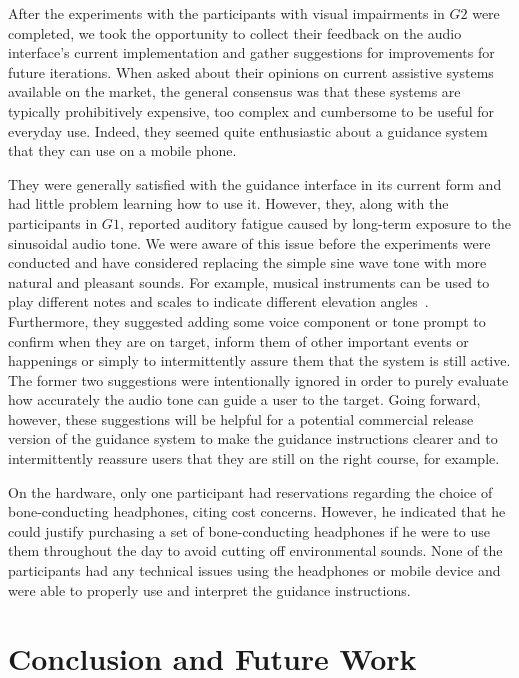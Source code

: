\documentclass{llncs}
\begin{document}
After the experiments with the participants with visual impairments in $G2$ were completed, we took the opportunity to collect their feedback on the audio interface's current implementation and gather suggestions for improvements for future iterations.
When asked about their opinions on current assistive systems available on the market, the general consensus was that these systems are typically prohibitively expensive, too complex and cumbersome to be useful for everyday use.
Indeed, they seemed quite enthusiastic about a guidance system that they can use on a mobile phone.

They were generally satisfied with the guidance interface in its current form and had little problem learning how to use it.
However, they, along with the participants in $G1$, reported auditory fatigue caused by long-term exposure to the sinusoidal audio tone.
We were aware of this issue before the experiments were conducted and have considered replacing the simple sine wave tone with more natural and pleasant sounds.
For example, musical instruments can be used to play different notes and scales to indicate different elevation angles~\cite{brewster1998using}.
Furthermore, they suggested adding some voice component or tone prompt to confirm when they are on target, inform them of other important events or happenings or simply to intermittently assure them that the system is still active.
The former two suggestions were intentionally ignored in order to purely evaluate how accurately the audio tone can guide a user to the target.
Going forward, however, these suggestions will be helpful for a potential commercial release version of the guidance system to make the guidance instructions clearer and to intermittently reassure users that they are still on the right course, for example.

On the hardware, only one participant had reservations regarding the choice of bone-conducting headphones, citing cost concerns. 
However, he indicated that he could justify purchasing a set of bone-conducting headphones if he were to use them throughout the day to avoid cutting off environmental sounds.
None of the participants had any technical issues using the headphones or mobile device and were able to properly use and interpret the guidance instructions.

\section{Conclusion and Future Work}\label{sec:conclusion}
\end{document}
